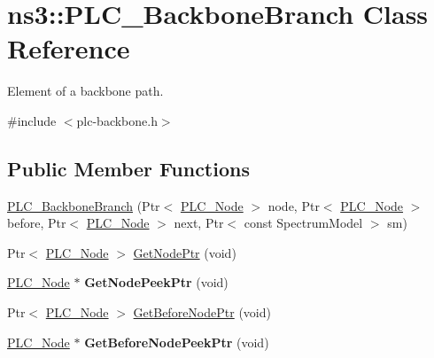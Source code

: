 \hypertarget{classns3_1_1PLC__BackboneBranch}{\section{ns3\-:\-:\-P\-L\-C\-\_\-\-Backbone\-Branch \-Class \-Reference}
\label{classns3_1_1PLC__BackboneBranch}
}


\-Element of a backbone path.  




{\ttfamily \#include $<$plc-\/backbone.\-h$>$}

\subsection*{\-Public \-Member \-Functions}
\begin{DoxyCompactItemize}
\item 
\hyperlink{classns3_1_1PLC__BackboneBranch_ac3149172bb5f48d090487fa8cec7ac8a}{\-P\-L\-C\-\_\-\-Backbone\-Branch} (\-Ptr$<$ \hyperlink{classns3_1_1PLC__Node}{\-P\-L\-C\-\_\-\-Node} $>$ node, \-Ptr$<$ \hyperlink{classns3_1_1PLC__Node}{\-P\-L\-C\-\_\-\-Node} $>$ before, \-Ptr$<$ \hyperlink{classns3_1_1PLC__Node}{\-P\-L\-C\-\_\-\-Node} $>$ next, \-Ptr$<$ const \-Spectrum\-Model $>$ sm)
\item 
\-Ptr$<$ \hyperlink{classns3_1_1PLC__Node}{\-P\-L\-C\-\_\-\-Node} $>$ \hyperlink{classns3_1_1PLC__BackboneBranch_a2730204c21937b6069f98576b0f39e0d}{\-Get\-Node\-Ptr} (void)
\item 
\hypertarget{classns3_1_1PLC__BackboneBranch_a2b8155ab6e4cb939ac1b37eea6ae737a}{\hyperlink{classns3_1_1PLC__Node}{\-P\-L\-C\-\_\-\-Node} $\ast$ {\bfseries \-Get\-Node\-Peek\-Ptr} (void)}\label{classns3_1_1PLC__BackboneBranch_a2b8155ab6e4cb939ac1b37eea6ae737a}

\item 
\-Ptr$<$ \hyperlink{classns3_1_1PLC__Node}{\-P\-L\-C\-\_\-\-Node} $>$ \hyperlink{classns3_1_1PLC__BackboneBranch_a1a78be8b86c6ec8840ec484f3a864e9e}{\-Get\-Before\-Node\-Ptr} (void)
\item 
\hypertarget{classns3_1_1PLC__BackboneBranch_a807a8309f21a92a0141a294652a5ef84}{\hyperlink{classns3_1_1PLC__Node}{\-P\-L\-C\-\_\-\-Node} $\ast$ {\bfseries \-Get\-Before\-Node\-Peek\-Ptr} (void)}\label{classns3_1_1PLC__BackboneBranch_a807a8309f21a92a0141a294652a5ef84}


\end{DoxyCompactItemize}
